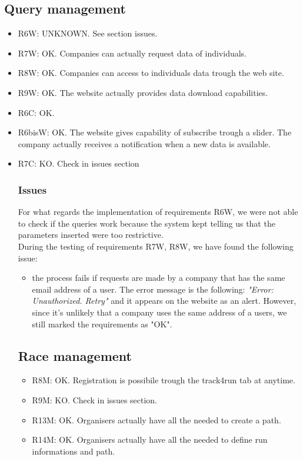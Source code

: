\documentclass{article}
\begin{document}
\subsection{Query management}
\begin{itemize}
	\item R6W: UNKNOWN. See section issues.
	\item R7W: OK. Companies can actually request data of individuals. 
	\item R8W: OK. Companies can access to individuals data trough the web site.
	\item R9W: OK. The website actually provides data download capabilities.
	\item R6C: OK.
	\item R6bisW: OK. The website gives capability of subscribe trough a slider. The company actually receives a notification when a new data is available.
	\item R7C: KO. Check in issues section

\subsubsection{Issues}

For what regards the implementation of requirements R6W, we were not able to check if the queries work because the system kept telling us that the parameters inserted were too restrictive.\\

During the testing of requirements R7W, R8W, we have found the following issue:
\begin{itemize}
	\item the process fails if requests are made by a company that has the same email address of a user. The error message is the following: \textit{"Error: Unauthorized. Retry"} and it appears on the website as an alert. However, since it's unlikely that a company uses the same address of a users, we still marked the requirements as "OK".
\end{itemize}

\subsection{Race management}
\begin{itemize}
	\item R8M: OK. Registration is possibile trough the track4run tab at anytime.
	\item R9M: KO. Check in issues section.
	\item R13M: OK. Organisers actually have all the needed to create a path.
	\item R14M: OK. Organisers actually have all the needed to define run informations and path.
\end{itemize}


\end{itemize}
\end{document}
